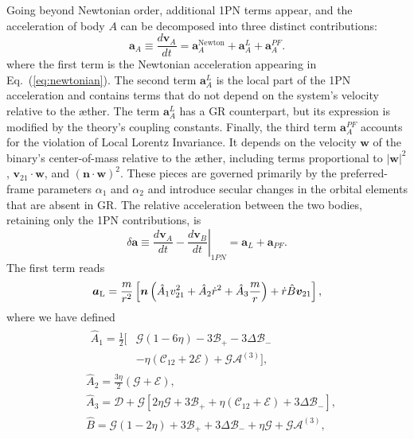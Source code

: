 \documentclass[
    floats,
    floatfix,
    amssymb,
    prd,
    twocolumn,
    superscriptaddress,
    nofootinbib,
    unicode,
    colorlinks=true,
    linktocpage=true
]{revtex4-2}
\begin{document}
Going beyond Newtonian order, additional 1PN terms appear, and the acceleration of body $A$ can be decomposed into three distinct contributions:
\begin{equation}
\mathbf{a}_A \equiv \frac{d\mathbf v_A}{dt}
=
\mathbf{a}_A^{\text{Newton}} + \mathbf{a}_{A}^{L} + \mathbf{a}_{A}^{PF}.
\end{equation}
where the first term is the Newtonian acceleration appearing in Eq.~(\ref{eq:newtonian}). The second term $\mathbf{a}_{A}^{L}$ is the local part of the 1PN acceleration and contains terms that do not depend on the system's velocity relative to the \ae ther. The term $\mathbf{a}_{A}^{L}$ has a GR counterpart, but its expression is modified by the theory's coupling constants. Finally, the third term $\mathbf{a}_A^{PF}$ accounts for the violation of Local Lorentz Invariance. It depends on the velocity $\bm{w}$ of the binary's center-of-mass relative to the \ae ther, including terms proportional to $|\bm w|^2$, $\mathbf v_{21}\cdot\bm{w}$, and $(\mathbf n\!\cdot\!\bm w)^2$. These pieces are governed primarily by the preferred-frame parameters $\alpha_1$ and $\alpha_2$ and introduce secular changes in the orbital elements that are absent in GR. The relative acceleration between the two bodies, retaining only the 1PN contributions, is
\begin{equation}
    \delta \mathbf{a} \equiv \left. \frac{d\mathbf v_A}{dt} - \frac{d\mathbf v_B}{dt}\right|_{1PN} = \mathbf{a}_L + \mathbf{a}_{PF}.
\end{equation}
The first term reads
\begin{align}
\bm{a}_{\rm L}=\frac{m}{r^2}\left[\bm{n}\left(\hat{A}_1 v_{21}^2 +\hat{A}_2 \dot{r}^2+\hat{A}_3 \frac{m}{r}\right)+\dot{r}\hat{B}\bm{v}_{21}\right],
\end{align}
where we have defined
%
\begin{align}
&\begin{aligned} \hat{A}_1 = \frac{1}{2} \big[ &\mathcal{G}(1-6\eta)-3\mathcal{B}_+-3\Delta\mathcal{B}_- \\
&-\eta(\mathcal{C}_{12}+2\mathcal{E})+\mathcal{G}\mathcal{A}^{(3)} \big], \end{aligned} \label{label_A1}\\
&\hat{A}_2=\frac{3\eta}{2}(\mathcal{G}+\mathcal{E}),\\
&\hat{A}_3=\mathcal{D}+\mathcal{G}\left[2\eta \mathcal{G}+3 \mathcal{B}_++\eta (\mathcal{C}_{12}+\mathcal{E})+3\Delta \mathcal{B}_-\right],\\
&\hat{B}=\mathcal{G}(1-2\eta)+3\mathcal{B}_++3\Delta \mathcal{B}_-+\eta\mathcal{G}+\mathcal{G}\mathcal{A}^{(3)},
\end{align}
\end{document}
